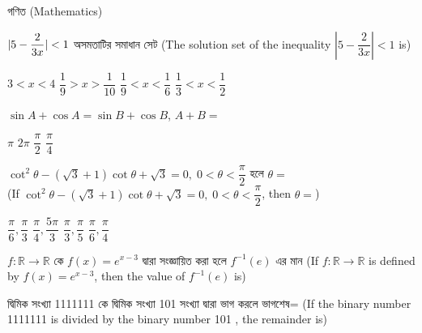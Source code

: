 \documentclass[addpoints]{exam}
\begin{document}
\begin{LARGE}
\begin{center}
গণিত (Mathematics)
\end{center}
\end{LARGE}
\begin{questions}

 \question $ \mathlarger{|}5-\dfrac{2}{3x}\mathlarger{|}<1 $  অসমতাটির সমাধান সেট (The solution set of the inequality $ |5-\dfrac{2}{3x}|<1 $ is)

\begin{oneparchoices}
\choice $ 3<x<4 $
\choice $ \dfrac{1}{9}> x > \dfrac{1}{10} $
\choice $ \dfrac{1}{9}< x < \dfrac{1}{6} $
\choice $ \dfrac{1}{3}< x < \dfrac{1}{2} $

\end{oneparchoices}

\question  $ \sin A + \cos A = \sin B + \cos B $, $ A+B =  $

\begin{oneparchoices}
\choice $ \pi $
\choice $ 2\pi $
\choice $ \dfrac{\pi}{2} $
\choice  $ \dfrac{\pi}{4} $

\end{oneparchoices}

\question  $ \cot^{2}\theta -(\sqrt{3}+1)\cot \theta +\sqrt{3} =0,\; 0<\theta <\dfrac{\pi}{2} $ হলে $ \theta = $\\ (If $ \cot^{2}\theta -(\sqrt{3}+1)\cot \theta +\sqrt{3} =0,\; 0<\theta <\dfrac{\pi}{2} $, then $ \theta = $)

\begin{oneparchoices}
\choice $ \dfrac{\pi}{6}, \dfrac{\pi}{3} $
\choice $ \dfrac{\pi}{4}, \dfrac{5\pi}{3} $
\choice $ \dfrac{\pi}{3}, \dfrac{\pi}{5} $
\choice $ \dfrac{\pi}{6}, \dfrac{\pi}{4} $

\end{oneparchoices}

\question  $ f:\mathbb{R}\to\mathbb{R} $ কে $ f(x) = e^{x-3} $ দ্বারা সংজ্ঞায়িত করা হলে $ f^{-1}(e) $ এর মান (If $ f:\mathbb{R}\to\mathbb{R} $ is defined by $ f(x) = e^{x-3} $, then the value of $ f^{-1}(e) $ is)

\begin{oneparchoices}

\end{oneparchoices}


\question  দ্বিমিক সংখ্যা 1111111 কে দ্বিমিক সংখ্যা 101 সংখ্যা দ্বারা ভাগ করলে ভাগশেষ= (If the binary number 1111111 is divided by the binary number 101 , the remainder is)


\end{questions}
\end{document}

